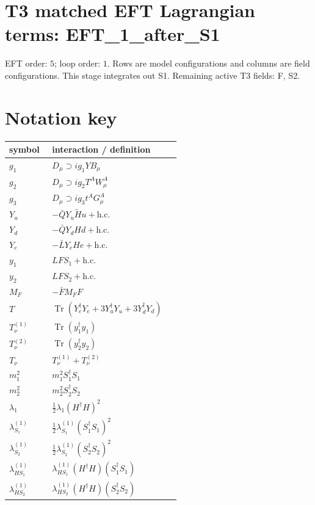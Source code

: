 \documentclass[8pt]{article}
\begin{document}
\begin{landscape}
\section*{T3 matched EFT Lagrangian terms: EFT\_1\_after\_S1}
EFT order: $5$; loop order: $1$. 
Rows are model configurations and columns are field configurations. This stage integrates out S1. Remaining active T3 fields: F, S2.
\section*{Notation key}
\begin{longtable}{@{}p{0.23\linewidth}p{0.69\linewidth}@{}}
\toprule
symbol & interaction / definition \\
\midrule
$g_1$ & $D_\mu\supset i g_1YB_\mu$ \\
$g_2$ & $D_\mu\supset i g_2T^AW_\mu^A$ \\
$g_3$ & $D_\mu\supset i g_3t^AG_\mu^A$ \\
$Y_u$ & $-\bar QY_u\widetilde Hu+\mathrm{h.c.}$ \\
$Y_d$ & $-\bar QY_dHd+\mathrm{h.c.}$ \\
$Y_e$ & $-\bar LY_eHe+\mathrm{h.c.}$ \\
$y_1$ & $LFS_1+\mathrm{h.c.}$ \\
$y_2$ & $LFS_2+\mathrm{h.c.}$ \\
$M_F$ & $-\bar FM_FF$ \\
$T$ & $\operatorname{Tr}(Y_e^\dagger Y_e+3Y_u^\dagger Y_u+3Y_d^\dagger Y_d)$ \\
$T_\nu^{(1)}$ & $\operatorname{Tr}(y_1^\dagger y_1)$ \\
$T_\nu^{(2)}$ & $\operatorname{Tr}(y_2^\dagger y_2)$ \\
$T_\nu$ & $T_\nu^{(1)}+T_\nu^{(2)}$ \\
$m_1^2$ & $m_1^2S_1^\dagger S_1$ \\
$m_2^2$ & $m_2^2S_2^\dagger S_2$ \\
$\lambda_1$ & $\frac12\lambda_1(H^\dagger H)^2$ \\
$\lambda_{S_1}^{(1)}$ & $\frac12\lambda_{S_1}^{(1)}(S_1^\dagger S_1)^2$ \\
$\lambda_{S_2}^{(1)}$ & $\frac12\lambda_{S_2}^{(1)}(S_2^\dagger S_2)^2$ \\
$\lambda_{HS_1}^{(1)}$ & $\lambda_{HS_1}^{(1)}(H^\dagger H)(S_1^\dagger S_1)$ \\
$\lambda_{HS_2}^{(1)}$ & $\lambda_{HS_2}^{(1)}(H^\dagger H)(S_2^\dagger S_2)$ \\

\end{longtable}
\end{landscape}
\end{document}
